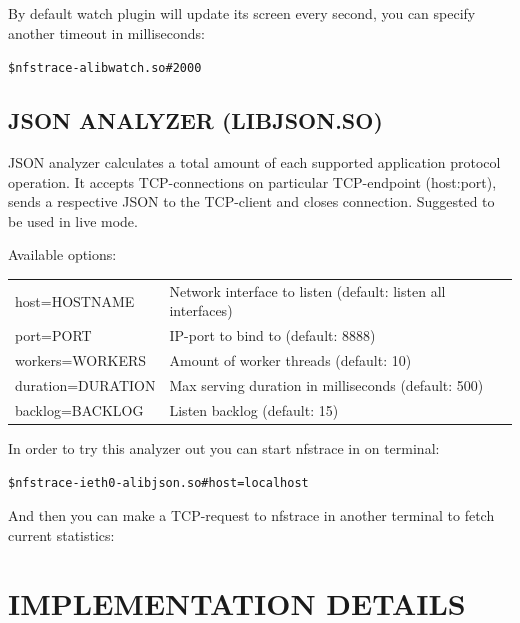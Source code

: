 \documentclass[oneside]{article}
\newcommand{\includetext}[1]{
\begin{alltt}
    \small{}
\end{alltt}
}
\newcommand*{\textfile}[1]{\textsf{#1}}
\newcommand*{\textprog}[1]{\textfile{#1}}
\begin{document}
\vspace{5mm}

By default watch plugin will update its screen every second, you can specify
another timeout in milliseconds:

\begin{alltt}
\$ nfstrace -a libwatch.so\#2000
\end{alltt}

\subsection{JSON ANALYZER (LIBJSON.SO)}
JSON analyzer calculates a total amount of each supported application protocol
operation. It accepts TCP-connections on particular TCP-endpoint (host:port),
sends a respective JSON to the TCP-client and closes connection. Suggested to
be used in live mode.

Available options:

\begin{minipage}[t]{\linewidth}
\begin{tabular}{ll}
\textprog{host=HOSTNAME} &
Network interface to listen (default: listen all interfaces)\\
\textprog{port=PORT} &
IP-port to bind to (default: 8888)\\
\textprog{workers=WORKERS} &
Amount of worker threads (default: 10)\\
\textprog{duration=DURATION} &
Max serving duration in milliseconds (default: 500)\\
\textprog{backlog=BACKLOG} &
Listen backlog (default: 15)\\
\end{tabular}
\end{minipage}

In order to try this analyzer out you can start \textprog{nfstrace} in on terminal:
\begin{alltt}
\$ nfstrace -i eth0 -a libjson.so\#host=localhost
\end{alltt}
And then you can make a TCP-request to \textprog{nfstrace} in another terminal to fetch
current statistics:

\begin{minipage}[t]{\linewidth}
\includetext{nfstrace_manual_includes/telnet_output.txt} 
\end{minipage}

\section{IMPLEMENTATION DETAILS}
\end{document}
